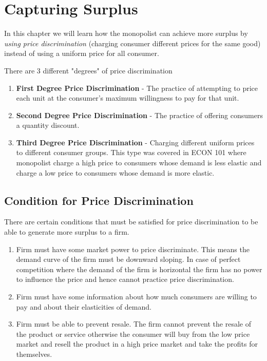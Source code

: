 \documentclass[../ECON-281-Notes.tex]{subfiles}
\begin{document}
\chapter{Capturing Surplus}

In this chapter we will learn how the monopolist can achieve more surplus by \emph{using price discrimination} (charging consumer different prices for the same good) instead of using a uniform price for all consumer.

There are 3 different "degrees" of price discrimination
\begin{enumerate}
  \item \textbf{First Degree Price Discrimination} - The practice of attempting to price each unit at the consumer's maximum willingness to pay for that unit.
  \item \textbf{Second Degree Price Discrimination} - The practice of offering consumers a quantity discount.
  \item \textbf{Third Degree Price Discrimination} - Charging different uniform prices to different consumer groups. This type was covered in ECON 101 where monopolist charge a high price to consumers whose demand is less elastic and charge a low price to consumers whose demand is more elastic.
\end{enumerate}

\section{Condition for Price Discrimination}
There are certain conditions that must be satisfied for price discrimination to be able to generate more surplus to a firm.

\begin{enumerate}
  \item Firm must have some market power to price discriminate. This means the demand curve of the firm must be downward sloping. In case of perfect competition where the demand of the firm is horizontal the firm has no power to influence the price and hence cannot practice price discrimination.
  \item Firm must have some information about how much consumers are willing to pay and about their elasticities of demand.
  \item Firm must be able to prevent resale. The firm cannot prevent the resale of the product or service otherwise the consumer will buy from the low price market and resell the product in a high price market and take the profits for themselves.
\end{enumerate}
\end{document}
